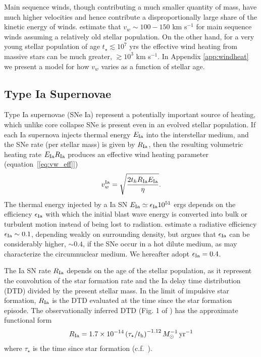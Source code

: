 \documentclass[usenatbib,fleqn]{mn2e}
\newcommand{\RateIa}{R_{\rm Ia}}
\begin{document}
Main sequence winds, though contributing a much smaller quantity of
mass, have much higher velocities and hence contribute a
disproportionally large share of the kinetic energy of winds.
\citet{NaimanSoares-Furtado+:2013a} estimate that $v_{w} \sim
100-150$ km s$^{-1}$ for main sequence winds assuming a relatively old
stellar population.  On the other hand, for a very young stellar
population of age $t_{\star} \lesssim 10^{7}$ yrs the effective wind
heating from massive stars can be much greater, $\gtrsim 10^{3}$ km
s$^{-1}$.  In Appendix \ref{app:windheat} we present a model for
how $v_{w}$ varies as a function of stellar age.

\subsection{Type Ia Supernovae} 

Type Ia supernovae (SNe Ia) represent a potentially important source of heating, which unlike core collapse SNe is present even in an evolved stellar population.  If each Ia supernova injects thermal energy $E_{\rm Ia}$ into the interstellar medium, and the SNe rate (per stellar mass) is given by $R_{\rm   Ia}$, then the resulting volumetric heating rate $E_{\rm Ia}R_{\rm  Ia}$ produces an effective wind heating parameter (equation~[\ref{eq:vw_eff}]) \begin{align} v_{w}^{\rm Ia} =\sqrt{\frac{2 t_h R_{\rm Ia}
E_{\rm Ia}}{\eta}} \label{eq:vw_sne}.
\end{align} The thermal energy injected by a Ia SN $E_{\rm Ia} \simeq
\epsilon_{\rm Ia} 10^{51}$ ergs depends on the efficiency $\epsilon_{\rm Ia}$
with which the initial blast wave energy is converted into bulk or turbulent
motion instead of being lost to radiation.  \cite{Thornton+98}
estimate a radiative efficiency $\epsilon_{\rm Ia} \sim 0.1$,
depending weakly on surrounding density, but \citet{Sharma+14} argues
that $\epsilon_{\rm Ia}$ can be considerably higher, $\sim 0.4$, if
the SNe occur in a hot dilute medium, as may characterize the circumnuclear medium.  We hereafter adopt $\epsilon_{\rm Ia} = 0.4$.

The Ia SN rate $\RateIa$ depends on the age of the stellar population, as it represent the convolution of the star formation rate and the Ia delay time distribution (DTD) divided by the present stellar mass.  In
the limit of impulsive star formation, $\RateIa$ is the DTD evaluated at the time since the star formation episode.  The observationally inferred DTD (Fig. 1 of \citealt{MaozMannucci+:2012a}) has the
approximate functional form \begin{align}
  R_{\rm Ia} =1.7\times 10^{-14}\left(\tau_{\star}/t_{\rm
      h}\right)^{-1.12} M_{\odot}^{-1}\,{\rm yr^{-1}}
\label{eq:DTD}
  \end{align}
  where $\tau_{\star}$ is the time since star formation
  (c.f.~\citealt{Scannapieco&Bildsten05}). 
\end{document}
